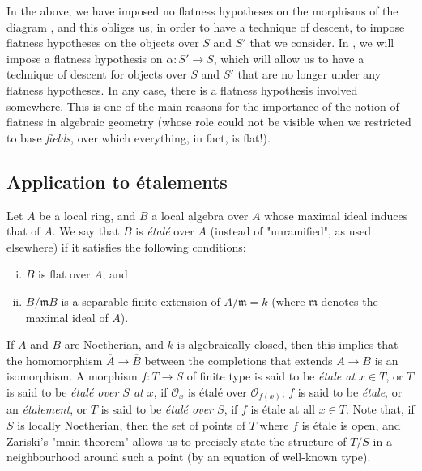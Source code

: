 \begin{remark}\label{fga3.i-a.2.c-remark}
    In the above, we have imposed no flatness hypotheses on the morphisms of the diagram , and this obliges us, in order to have a technique of descent, to impose flatness hypotheses on the objects over $S$ and $S'$ that we consider.
    In , we will impose a flatness hypothesis on $\alpha\colon S'\to S$, which will allow us to have a technique of descent for objects over $S$ and $S'$ that are no longer under any flatness hypotheses.
    In any case, there is a flatness hypothesis involved somewhere.
    This is one of the main reasons for the importance of the notion of flatness in algebraic geometry (whose role could not be visible when we restricted to base \emph{fields}, over which everything, in fact, is flat!).
\end{remark}

\subsection{Application to étalements}\label{fga3.i-a.3}

Let $A$ be a local ring, and $B$ a local algebra over $A$ whose maximal ideal induces that of $A$.
We say that $B$ is \emph{étalé} over $A$ (instead of "unramified", as used elsewhere) if it satisfies the following conditions:

\begin{enumerate}[i.]
    \item $B$ is flat over $A$; and
    \item $B/\mathfrak{m}B$ is a separable finite extension of $A/\mathfrak{m}=k$ (where $\mathfrak{m}$ denotes the maximal ideal of $A$).
\end{enumerate}

If $A$ and $B$ are Noetherian, and $k$ is algebraically closed, then this implies that the homomorphism $\overline{A}\to\overline{B}$ between the completions that extends $A\to B$ is an isomorphism.
A morphism $f\colon T\to S$ of finite type is said to be \emph{étale at $x\in T$}, or $T$ is said to be \emph{étalé over $S$ at $x$}, if $\mathcal{O}_x$ is étalé over $\mathcal{O}_{f(x)}$;
$f$ is said to be \emph{étale}, or an \emph{étalement}, or $T$ is said to be \emph{étalé over $S$}, if $f$ is étale at all $x\in T$.
Note that, if $S$ is locally Noetherian, then the set of points of $T$ where $f$ is étale is open, and Zariski's "main theorem" allows us to precisely state the structure of $T/S$ in a neighbourhood around such a point (by an equation of well-known type).


